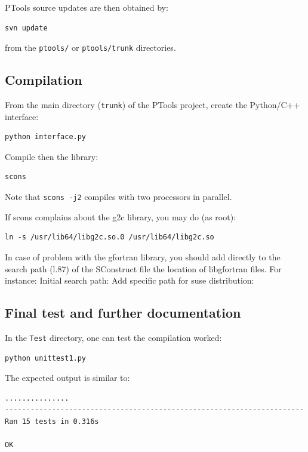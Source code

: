 \documentclass[12pt,a4paper]{article}
\begin{document}
PTools source updates are then obtained by:
\begin{verbatim}
svn update
\end{verbatim}
from the {\tt ptools/} or {\tt ptools/trunk} directories.


\subsection{Compilation}
From the main directory ({\tt trunk}) of the PTools project, create the Python/C++ interface:
\begin{verbatim}
python interface.py
\end{verbatim}

Compile then the library:
\begin{verbatim}
scons
\end{verbatim}

Note that {\tt scons -j2} compiles with two processors in parallel.

If scons complains about the g2c library, you may do (as root):
\begin{verbatim}
ln -s /usr/lib64/libg2c.so.0 /usr/lib64/libg2c.so
\end{verbatim}

In case of problem with the gfortran library, you should add directly to the search path (l.87)
of the SConstruct file the location of libgfortran files. For instance: 
\newline Initial search path:
\newline Add specific path for suse distribution:

\subsection{Final test and further documentation}

In the {\tt Test} directory, one can test the compilation worked:
\begin{verbatim}
python unittest1.py
\end{verbatim}

The expected output is similar to:
\begin{verbatim}
...............
----------------------------------------------------------------------
Ran 15 tests in 0.316s

OK
\end{verbatim}
\end{document}
